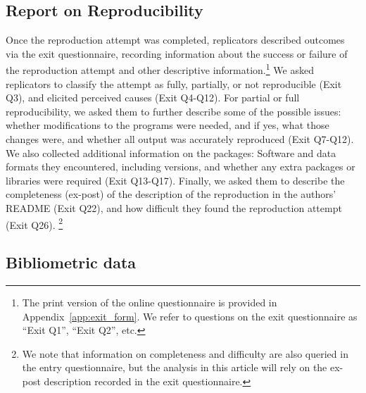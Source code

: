 \documentclass{cje} %
\theoremstyle{plain}%
\theoremstyle{definition}
\theoremstyle{remark}
\begin{document}


\subsection{Report on Reproducibility}

Once the reproduction attempt was completed, replicators described outcomes via the exit questionnaire, recording information about the success or failure of the reproduction attempt and other descriptive information.\footnote{The print version of the online questionnaire is provided in Appendix~\ref{app:exit_form}. We refer to questions on the exit questionnaire as ``Exit Q1'', ``Exit Q2'', etc.} We asked replicators to classify the attempt as fully, partially, or not reproducible (Exit Q3), and elicited perceived causes (Exit Q4-Q12). 
For partial or full reproducibility, we asked them to further describe some of the possible issues: whether modifications to the programs were needed, and if yes, what those changes were, and whether all output was accurately reproduced (Exit Q7-Q12). We also collected additional information on the packages: Software and data formats they encountered, including versions, and whether any extra packages or libraries were required (Exit Q13-Q17). Finally, we asked them to describe the completeness (ex-post) of the description of the reproduction in the authors' README (Exit Q22), and how difficult they found the reproduction attempt (Exit Q26).%
%
\footnote{
We note that information on completeness and difficulty are also queried in the entry questionnaire, but the analysis in this article will rely on the ex-post description recorded in the exit questionnaire. }



\subsection{Bibliometric data}
\end{document}
